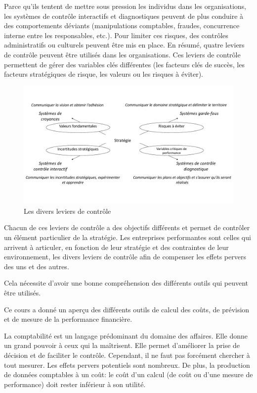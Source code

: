 \documentclass[oneside]{kaobook}
\begin{document}
Parce qu'ils tentent de mettre sous pression les individus dans les organisations, les systèmes de contrôle interactifs et diagnostiques peuvent de plus conduire à des comportements déviants (manipulations comptables, fraudes, concurrence interne entre les responsables, etc.). Pour limiter ces risques, des contrôles administratifs ou culturels peuvent être mis en place. En résumé, quatre leviers de contrôle peuvent être utilisés dans les organisations. Ces leviers de contrôle permettent de gérer des variables clés différentes (les facteurs clés de succès, les facteurs stratégiques de risque, les valeurs ou les risques à éviter). 

\begin{figure}[H]

\includegraphics{./img/levers.pdf}
\caption{Les divers leviers de contrôle}
\end{figure}

Chacun de ces leviers de contrôle a des objectifs différents et permet de contrôler un élément particulier de la stratégie. Les entreprises performantes sont celles qui arrivent à articuler, en fonction de leur stratégie et des contraintes de leur environnement, les divers leviers de contrôle afin de compenser les effets pervers des uns et des autres.

Cela nécessite d'avoir une bonne compréhension des différents outils qui peuvent être utilisés. 

\begin{kaobox}
Ce cours a donné un aperçu des différents outils de calcul des coûts, de prévision et de mesure de la performance financière. 

La comptabilité est un langage prédominant du domaine des affaires. Elle donne un grand pouvoir à ceux qui la maîtrisent. Elle permet d'améliorer la prise de décision et de faciliter le contrôle. Cependant, il ne faut pas forcément chercher à tout mesurer. Les effets pervers potentiels sont nombreux. De plus, la production de données comptables à un coût: le coût d’un calcul (de coût ou d'une mesure de performance) doit rester inférieur à son utilité.
\end{kaobox}
\end{document}

